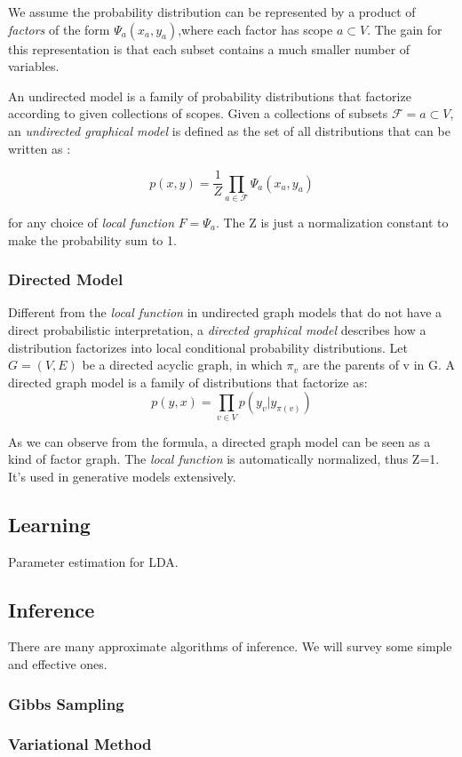 We assume the probability distribution can be represented by a product of \emph{factors} of the form $\Psi_{a}(x_{a},y_{a})$,where each factor has scope $a \subset V$. The gain for this representation is that each subset contains a much smaller number of variables. 

An undirected model is a family of probability distributions that factorize according to given collections of scopes. Given a collections of subsets $\mathcal{F}=a \subset V$, an \emph{undirected graphical model} is defined as the set of all distributions that can be written as :

\begin{equation}
p(x,y) = \frac{1}{Z} \prod_{a \in \mathcal{F}} \Psi_{a}(x_{a},y_{a})
\end{equation}

for any choice of \emph{local function} $F = {\Psi_{a}}$. The Z is just a normalization constant to make the probability sum to 1. 

\subsubsection{Directed Model}
Different from the \emph{local function} in undirected graph models that do not have a direct probabilistic interpretation, a \emph{directed graphical model} describes how a distribution factorizes into local conditional probability distributions. Let $G=(V,E)$ be a directed acyclic graph, in which $\pi_{v}$ are the parents of v in G. A directed graph model is a family of distributions that factorize as:
\begin{equation}
p(y,x)=\prod_{v \in V} p(y_{v}|y_{\pi(v)})
\end{equation}

As we can observe from the formula, a directed graph model can be seen as a kind of factor graph. The \emph{local function} is automatically normalized, thus Z=1. It's used in generative models extensively. 

\subsection{Learning}
Parameter estimation for LDA. \cite{heinrich2005parameter}

\subsection{Inference}
There are many approximate algorithms of inference. We will survey some simple and effective ones.

\subsubsection{Gibbs Sampling}
\cite{casella1992explaining}

\subsubsection{Variational Method}
